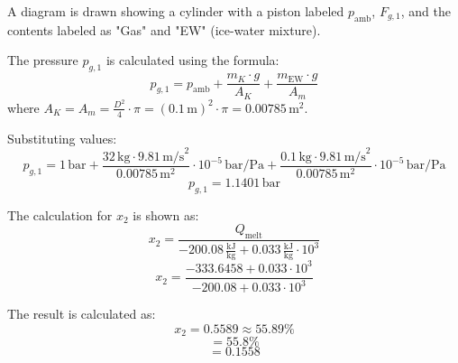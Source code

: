 A diagram is drawn showing a cylinder with a piston labeled \( p_{\text{amb}} \), \( F_{g,1} \), and the contents labeled as "Gas" and "EW" (ice-water mixture).  

The pressure \( p_{g,1} \) is calculated using the formula:  
\[
p_{g,1} = p_{\text{amb}} + \frac{m_K \cdot g}{A_K} + \frac{m_{\text{EW}} \cdot g}{A_m}
\]  
where \( A_K = A_m = \frac{D^2}{4} \cdot \pi = (0.1 \, \text{m})^2 \cdot \pi = 0.00785 \, \text{m}^2 \).  

Substituting values:  
\[
p_{g,1} = 1 \, \text{bar} + \frac{32 \, \text{kg} \cdot 9.81 \, \text{m/s}^2}{0.00785 \, \text{m}^2} \cdot 10^{-5} \, \text{bar/Pa} + \frac{0.1 \, \text{kg} \cdot 9.81 \, \text{m/s}^2}{0.00785 \, \text{m}^2} \cdot 10^{-5} \, \text{bar/Pa}
\]  
\[
p_{g,1} = 1.1401 \, \text{bar}
\]

The calculation for \( x_2 \) is shown as:  
\[
x_2 = \frac{Q_{\text{melt}}}{-200.08 \, \frac{\text{kJ}}{\text{kg}} + 0.033 \, \frac{\text{kJ}}{\text{kg}} \cdot 10^3}
\]  
\[
x_2 = \frac{-333.6458 + 0.033 \cdot 10^3}{-200.08 + 0.033 \cdot 10^3}
\]  

The result is calculated as:  
\[
x_2 = 0.5589 \approx 55.89\%
\]  
\[
= 55.8\%
\]  
\[
= 0.1558
\]